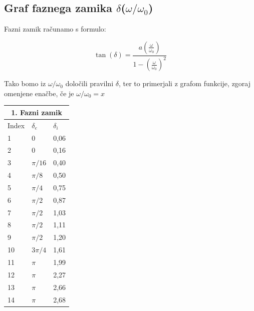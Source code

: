 \subsection{Graf faznega zamika $\delta$($\omega/\omega_0$)}

Fazni zamik računamo s formulo:

\centering \large
\begin{equation}
     \tan(\delta) = \frac{a(\frac{\omega}{\omega_0})}{1-(\frac{\omega}{\omega_0})^2}
\end{equation}
\raggedright \normalsize

Tako bomo iz $\omega/\omega_0$ določili pravilni $\delta$, ter to primerjali z grafom funkcije, zgoraj omenjene enačbe, če je $\omega/\omega_0 = x$ 

\centering \large
\begin{tabular}{|p{1.5cm}|p{1.5cm}|p{1.5cm}|}
    \hline
    \multicolumn{3}{|c|}{1. Fazni zamik}\\
    \hline
    Index & $\delta_e$ & $\delta_i$ \\
    \hline
    1 & 0 & 0,06\\
    2 & 0 & 0,16\\
    3 & $\pi/16$ & 0,40\\
    4 & $\pi/8$ & 0,50\\
    5 & $\pi/4$ & 0,75\\
    6 & $\pi/2$ & 0,87 \\
    7 & $\pi/2$ & 1,03\\
    8 & $\pi/2$ & 1,11\\
    9 & $\pi/2$ & 1,20\\
    10 & $3\pi/4$ & 1,61\\
    11 & $\pi$ & 1,99\\
    12 & $\pi$ & 2,27\\
    13 & $\pi$ & 2,66\\
    14 & $\pi$ & 2,68\\
    \hline
\end{tabular}


